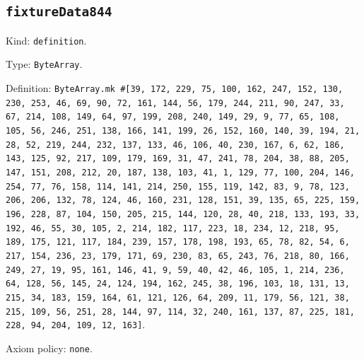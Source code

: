 \documentclass[11pt]{article}
\begin{document}
\subsection*{\texttt{fixtureData844}}
\noindent Kind: \texttt{definition}.\par
\noindent Type: \texttt{ByteArray}.\par
\noindent Definition: \texttt{ByteArray.mk \#[39, 172, 229, 75, 100, 162, 247, 152, 130, 230, 253, 46, 69, 90, 72, 161, 144, 56, 179, 244, 211, 90, 247, 33, 67, 214, 108, 149, 64, 97, 199, 208, 240, 149, 29, 9, 77, 65, 108, 105, 56, 246, 251, 138, 166, 141, 199, 26, 152, 160, 140, 39, 194, 21, 28, 52, 219, 244, 232, 137, 133, 46, 106, 40, 230, 167, 6, 62, 186, 143, 125, 92, 217, 109, 179, 169, 31, 47, 241, 78, 204, 38, 88, 205, 147, 151, 208, 212, 20, 187, 138, 103, 41, 1, 129, 77, 100, 204, 146, 254, 77, 76, 158, 114, 141, 214, 250, 155, 119, 142, 83, 9, 78, 123, 206, 206, 132, 78, 124, 46, 160, 231, 128, 151, 39, 135, 65, 225, 159, 196, 228, 87, 104, 150, 205, 215, 144, 120, 28, 40, 218, 133, 193, 33, 192, 46, 55, 30, 105, 2, 214, 182, 117, 223, 18, 234, 12, 218, 95, 189, 175, 121, 117, 184, 239, 157, 178, 198, 193, 65, 78, 82, 54, 6, 217, 154, 236, 23, 179, 171, 69, 230, 83, 65, 243, 76, 218, 80, 166, 249, 27, 19, 95, 161, 146, 41, 9, 59, 40, 42, 46, 105, 1, 214, 236, 64, 128, 56, 145, 24, 124, 194, 162, 245, 38, 196, 103, 18, 131, 13, 215, 34, 183, 159, 164, 61, 121, 126, 64, 209, 11, 179, 56, 121, 38, 215, 109, 56, 251, 28, 144, 97, 114, 32, 240, 161, 137, 87, 225, 181, 228, 94, 204, 109, 12, 163]}.\par
\noindent Axiom policy: \texttt{none}.\par
\end{document}
